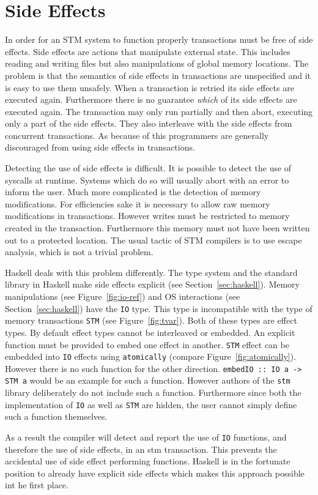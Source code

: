 \section{Side Effects}

\label{sec:side-effects}

In order for an STM system to function properly transactions must be free of
side effects. Side effects are actions that manipulate external state. This
includes reading and writing files but also manipulations of global memory
locations. The problem is that the semantics of side effects in transactions are
unspecified and it is easy to use them unsafely. When a transaction is retried
its side effects are executed again. Furthermore there is no guarantee
\emph{which} of its side effects are executed again. The transaction may only
run partially and then abort, executing only a part of the side effects. They
also interleave with the side effects from concurrent transactions. As because
of this programmers are generally discouraged from using side effects in
transactions.

Detecting the use of side effects is difficult. It is possible to detect the use
of syscalls at runtime. Systems which do so will usually abort with an error to
inform the user. Much more complicated is the detection of memory modifications.
For efficiencies sake it is necessary to allow raw memory modifications in
transactions. However writes must be restricted to memory created in the
transaction. Furthermore this memory must not have been written out to a
protected location. The usual tactic of STM compilers is to use escape analysis,
which is not a trivial problem.

Haskell deals with this problem differently. The type system and the standard
library in Haskell make side effects explicit (see Section~\ref{sec:haskell}).
Memory manipulations (see Figure~\ref{fig:io-ref}) and OS interactions (see
Section~\ref{sec:haskell}) have the \texttt{IO} type. This type is incompatible
with the type of memory transactions \texttt{STM} (see Figure~\ref{fig:tvar}).
Both of these types are effect types. By default effect types cannot be
interleaved or embedded. An explicit function must be provided to embed one
effect in another. \texttt{STM} effect can be embedded into \texttt{IO} effects
using \texttt{atomically} (compare Figure~\ref{fig:atomically}). However there
is no such function for the other direction. \texttt{embedIO :: IO a -> STM a}
would be an example for such a function. However authors of the \texttt{stm}
library deliberately do not include such a function. Furthermore since both the
implementation of \texttt{IO} as well as \texttt{STM} are hidden, the user
cannot simply define such a function themselves.

As a result the compiler will detect and report the use of \texttt{IO}
functions, and therefore the use of side effects, in an stm transaction. This
prevents the accidental use of side effect performing functions. Haskell is in
the fortunate position to already have explicit side effects which makes this
approach possible int he first place.
